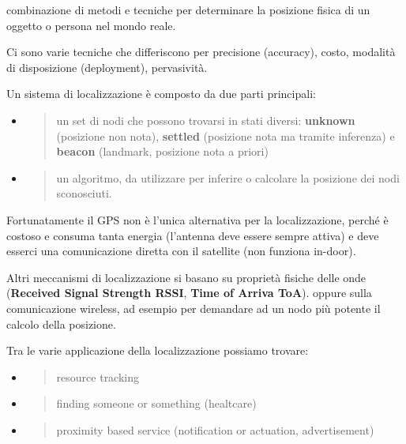 combinazione di metodi e tecniche per determinare la posizione fisica di
un oggetto o persona nel mondo reale.

Ci sono varie tecniche che differiscono per precisione (accuracy),
costo, modalità di disposizione (deployment), pervasività.

Un sistema di localizzazione è composto da due parti principali:

\begin{itemize}
\item
  \begin{quote}
  un set di nodi che possono trovarsi in stati diversi: \textbf{unknown}
  (posizione non nota), \textbf{settled} (posizione nota ma tramite
  inferenza) e \textbf{beacon} (landmark, posizione nota a priori)
  \end{quote}
\item
  \begin{quote}
  un algoritmo, da utilizzare per inferire o calcolare la posizione dei
  nodi sconosciuti.
  \end{quote}
\end{itemize}

Fortunatamente il GPS non è l'unica alternativa per la localizzazione,
perché è costoso e consuma tanta energia (l'antenna deve essere sempre
attiva) e deve esserci una comunicazione diretta con il satellite (non
funziona in-door).

Altri meccanismi di localizzazione si basano su proprietà fisiche delle
onde (\textbf{Received Signal Strength RSSI}, \textbf{Time of Arriva
ToA}). oppure sulla comunicazione wireless, ad esempio per demandare ad
un nodo più potente il calcolo della posizione.

Tra le varie applicazione della localizzazione possiamo trovare:

\begin{itemize}
\item
  \begin{quote}
  resource tracking
  \end{quote}
\item
  \begin{quote}
  finding someone or something (healtcare)
  \end{quote}
\item
  \begin{quote}
  proximity based service (notification or actuation, advertisement)
  \end{quote}
\end{itemize}

